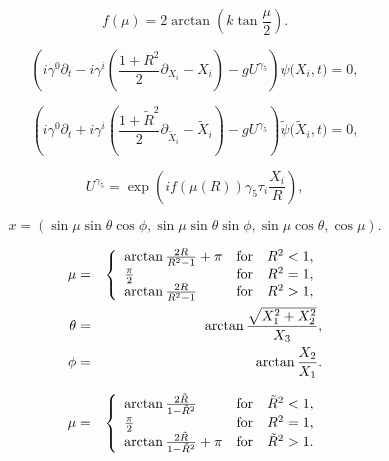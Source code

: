 \documentclass[]{article}
\begin{document}
	
	\begin{equation}
		\label{conformal}
		f(\mu) = 2 \arctan \left( k \tan \frac{\mu}{2} \right).
	\end{equation}
	
	\begin{equation}
		\label{Dirac1}
		\left( i \gamma^0 \partial_t - 
		i \gamma^i \left(\frac{1+R^2}{2} \partial_{X_i} - X_i \right)
		- g U^{\gamma_5}
		\right)
		\psi \big(X_i,t \big) = 0, 
	\end{equation}
	
	\begin{equation}
		\label{Dirac2}
		\left( i \gamma^0 \partial_t + 
		i \gamma^i \left(\frac{1+{\tilde R}^2}{2} \partial_{{\tilde X}_i} - 
		{\tilde X}_i \right)
		-g U^{\gamma_5}
		\right)
		{\tilde \psi} \big( {\tilde X}_i,t \big) = 0,
	\end{equation}
	
	\begin{equation}
		U^{\gamma_5} = \exp \left( i f(\mu(R)) \gamma_5 \tau_i \frac{X_i}{R} 
		\right),
	\end{equation}
	
	\begin{equation}
		x = \left( \sin \mu \sin \theta \cos \phi,
		\sin \mu \sin \theta \sin \phi,
		\sin \mu \cos \theta,
		\cos \mu
		\right).
	\end{equation}
	
	\begin{eqnarray}
		\nonumber
		\mu &=& \left\{
		\begin{array}{ll}
			\arctan \frac{2R}{R^2-1} +\pi & {\rm for}~~~ R^2<1, \\
			\frac{\pi}{2} & {\rm for}~~~ R^2 = 1,\\
			\arctan \frac{2R}{R^2-1}      & {\rm for}~~~ R^2>1,
		\end{array} 
		\right. \\
		\nonumber
		\theta &=& \arctan \frac{\sqrt{X_1^2 + X_2^2}}{X_3}, \\
		\phi &=& \arctan \frac{X_2}{X_1}.
	\end{eqnarray}
	
	\begin{eqnarray}
		\mu &=& \left\{
		\begin{array}{ll}
			\arctan \frac{2 {\tilde R}}{1-{\tilde R}^2}  & {\rm for}~~~ 
			{\tilde R}^2<1, \\ 
			\frac{\pi}{2} & {\rm for}~~~ R^2 = 1,\\
			\arctan \frac{2 {\tilde R}}{1-{\tilde R}^2} + \pi     & {\rm for}~~~
			{\tilde R}^2>1.
		\end{array} 
		\right. 
	\end{eqnarray}
	
\end{document}
